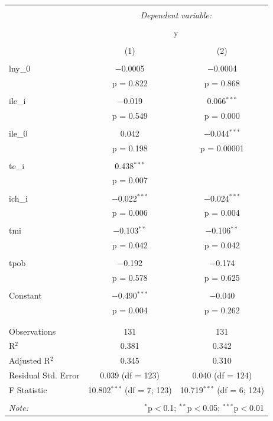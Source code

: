 \begin{table}[!htbp] \centering 
    \tiny
  \caption{} 
  \label{} 
\begin{tabular}{@{\extracolsep{5pt}}lcc} 
\\[-1.8ex]\hline 
\hline \\[-1.8ex] 
 & \multicolumn{2}{c}{\textit{Dependent variable:}} \\ 
\cline{2-3} 
\\[-1.8ex] & \multicolumn{2}{c}{y} \\ 
\\[-1.8ex] & (1) & (2)\\ 
\hline \\[-1.8ex] 
 lny\_0 & $-$0.0005 & $-$0.0004 \\ 
  & p = 0.822 & p = 0.868 \\ 
  & & \\ 
 ile\_i & $-$0.019 & 0.066$^{***}$ \\ 
  & p = 0.549 & p = 0.000 \\ 
  & & \\ 
 ile\_0 & 0.042 & $-$0.044$^{***}$ \\ 
  & p = 0.198 & p = 0.00001 \\ 
  & & \\ 
 tc\_i & 0.438$^{***}$ &  \\ 
  & p = 0.007 &  \\ 
  & & \\ 
 ich\_i & $-$0.022$^{***}$ & $-$0.024$^{***}$ \\ 
  & p = 0.006 & p = 0.004 \\ 
  & & \\ 
 tmi & $-$0.103$^{**}$ & $-$0.106$^{**}$ \\ 
  & p = 0.042 & p = 0.042 \\ 
  & & \\ 
 tpob & $-$0.192 & $-$0.174 \\ 
  & p = 0.578 & p = 0.625 \\ 
  & & \\ 
 Constant & $-$0.490$^{***}$ & $-$0.040 \\ 
  & p = 0.004 & p = 0.262 \\ 
  & & \\ 
\hline \\[-1.8ex] 
Observations & 131 & 131 \\ 
R$^{2}$ & 0.381 & 0.342 \\ 
Adjusted R$^{2}$ & 0.345 & 0.310 \\ 
Residual Std. Error & 0.039 (df = 123) & 0.040 (df = 124) \\ 
F Statistic & 10.802$^{***}$ (df = 7; 123) & 10.719$^{***}$ (df = 6; 124) \\ 
\hline 
\hline \\[-1.8ex] 
\textit{Note:}  & \multicolumn{2}{r}{$^{*}$p$<$0.1; $^{**}$p$<$0.05; $^{***}$p$<$0.01} \\ 
\end{tabular} 
\end{table}




